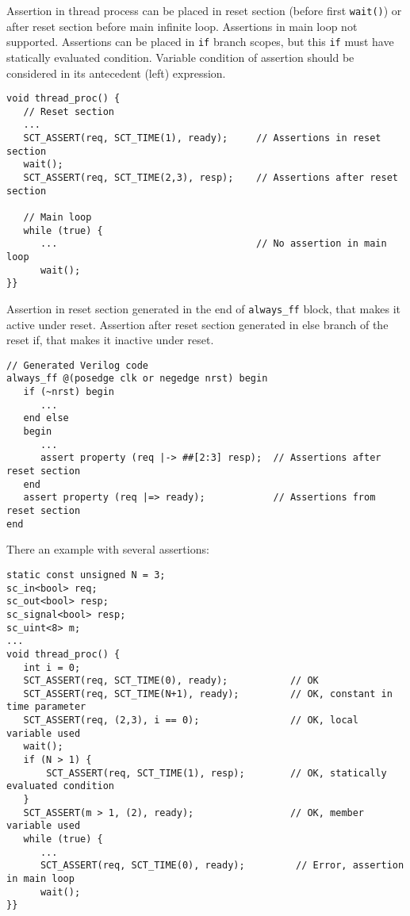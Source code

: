 Assertion in thread process can be placed in reset section (before first {\tt wait()}) or after reset section before main infinite loop. Assertions in main loop not supported. Assertions can be placed in {\tt if} branch scopes, but this {\tt if} must have statically evaluated condition. Variable condition of assertion should be considered in its antecedent (left) expression. 

\begin{lstlisting}[style=mycpp]
void thread_proc() {
   // Reset section
   ...
   SCT_ASSERT(req, SCT_TIME(1), ready);     // Assertions in reset section
   wait();                        
   SCT_ASSERT(req, SCT_TIME(2,3), resp);    // Assertions after reset section

   // Main loop 
   while (true) { 
      ...                                   // No assertion in main loop 
      wait();
}}
\end{lstlisting}

Assertion in reset section generated in the end of {\tt always\_ff} block, that makes it active under reset. Assertion after reset section generated in else branch of the reset if, that makes it inactive under reset.

\begin{lstlisting}[style=myverilog]
// Generated Verilog code
always_ff @(posedge clk or negedge nrst) begin
   if (~nrst) begin
      ...
   end else 
   begin 
      ... 
      assert property (req |-> ##[2:3] resp);  // Assertions after reset section 
   end 
   assert property (req |=> ready);            // Assertions from reset section 
end
\end{lstlisting}

There an example with several assertions:

\begin{lstlisting}[style=mycpp]
static const unsigned N = 3;
sc_in<bool> req;
sc_out<bool> resp;
sc_signal<bool> resp;
sc_uint<8> m;
...
void thread_proc() {
   int i = 0;
   SCT_ASSERT(req, SCT_TIME(0), ready);           // OK
   SCT_ASSERT(req, SCT_TIME(N+1), ready);         // OK, constant in time parameter
   SCT_ASSERT(req, (2,3), i == 0);                // OK, local variable used
   wait();
   if (N > 1) {
       SCT_ASSERT(req, SCT_TIME(1), resp);        // OK, statically evaluated condition
   }
   SCT_ASSERT(m > 1, (2), ready);                 // OK, member variable used
   while (true) {   
      ...
      SCT_ASSERT(req, SCT_TIME(0), ready);         // Error, assertion in main loop
      wait();
}}
\end{lstlisting}

